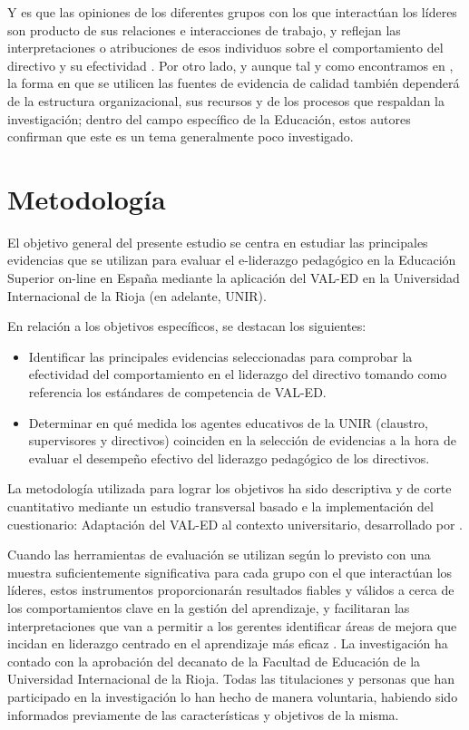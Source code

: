 \documentclass[spanish]{textolivre}
\begin{document}
Y es que las opiniones de los diferentes grupos con los que interactúan los líderes son producto de sus relaciones e interacciones de trabajo, y reflejan las interpretaciones o atribuciones de esos individuos sobre el comportamiento del directivo y su efectividad \cite{jepsen_perceived_2022}. Por otro lado, y aunque tal y como encontramos en \textcite{rickinson_framework_2022}, la forma en que se utilicen las fuentes de evidencia de calidad también dependerá de la estructura organizacional, sus recursos y de los procesos que respaldan la investigación; dentro del campo específico de la Educación, estos autores confirman que este es un tema generalmente poco investigado. 


\section{Metodología}
El objetivo general del presente estudio se centra en estudiar las principales evidencias que se utilizan para evaluar el e-liderazgo pedagógico en la Educación Superior on-line en España mediante la aplicación del VAL-ED en la Universidad Internacional de la Rioja (en adelante, UNIR). 

En relación a los objetivos específicos, se destacan los siguientes:

\begin{itemize}
 \item Identificar las principales evidencias seleccionadas para comprobar la efectividad del comportamiento en el liderazgo del directivo tomando como referencia los estándares de competencia de VAL-ED.
 \item Determinar en qué medida los agentes educativos de la UNIR (claustro, supervisores y directivos) coinciden en la selección de evidencias a la hora de evaluar el desempeño efectivo del liderazgo pedagógico de los directivos.
\end{itemize}

La metodología utilizada para lograr los objetivos ha sido descriptiva y de corte cuantitativo mediante un estudio transversal basado e la implementación del cuestionario: Adaptación del VAL-ED al contexto universitario, desarrollado por \textcite{palomino2022}.

Cuando las herramientas de evaluación se utilizan según lo previsto con una muestra suficientemente significativa para cada grupo con el que interactúan los líderes, estos instrumentos proporcionarán resultados fiables y válidos a cerca de los comportamientos clave en la gestión del aprendizaje, y facilitaran las interpretaciones que van a permitir a los gerentes identificar áreas de mejora que incidan en liderazgo centrado en el aprendizaje más eficaz \cite{palomino2022}. La investigación ha contado con la aprobación del decanato de la Facultad de Educación de la Universidad Internacional de la Rioja. Todas las titulaciones y personas que han participado en la investigación lo han hecho de manera voluntaria, habiendo sido informados previamente de las características y objetivos de la misma.
\end{document}
